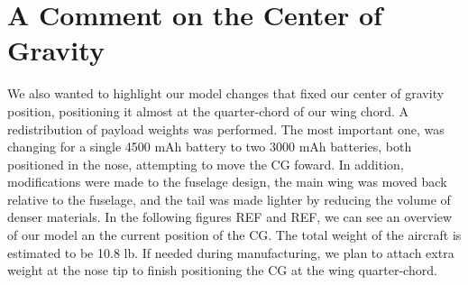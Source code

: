 \chapter{A Comment on the Center of Gravity} \label{cp:cg}


We also wanted to highlight our model changes that fixed our center of gravity position, positioning it almost at the quarter-chord of our wing chord. A redistribution of payload weights was performed. The most important one, was changing for a single 4500 mAh battery to two 3000 mAh batteries, both positioned in the nose, attempting to move the CG foward. In addition, modifications were made to the fuselage design, the main wing was moved back relative to the fuselage, and the tail was made lighter by reducing the volume of denser materials. In the following figures REF and REF, we can see an overview of our model an the current position of the CG. The total weight of the aircraft is estimated to be 10.8 lb. If needed during manufacturing, we plan to attach extra weight at the nose tip to finish positioning the CG at the wing quarter-chord.
